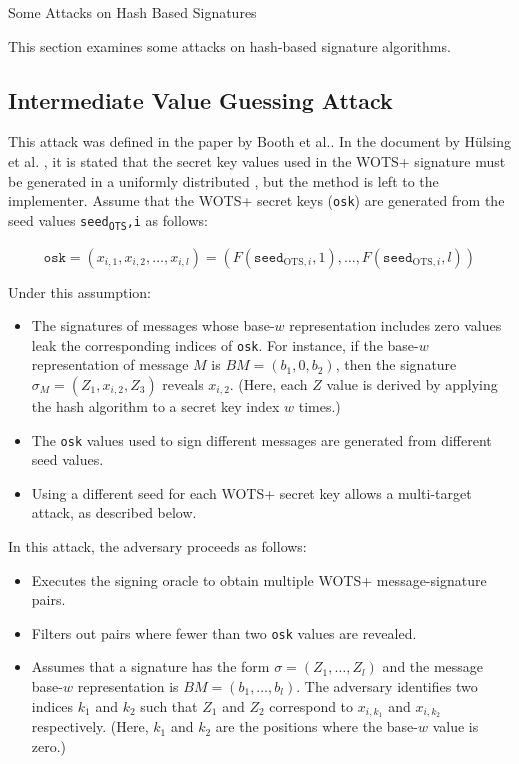 \begin{section}{Some Attacks on Hash Based Signatures}


This section examines some attacks on hash-based signature algorithms.

\subsection{Intermediate Value Guessing Attack}

This attack was defined in the paper by Booth et al.\cite{booth2021intermediate}. In the document by Hülsing et al. \cite{huelsing2018rfc}, it is stated that the secret key values used in the WOTS+ signature must be generated in a uniformly distributed , but the method is left to the implementer. Assume that the WOTS+ secret keys (\texttt{osk}) are generated from the seed values \texttt{seed\textsubscript{OTS},i} as follows:

\[
\texttt{osk} = (x_{i,1}, x_{i,2}, \ldots, x_{i,l}) = (F(\texttt{seed}_{\text{OTS},i},1), \ldots, F(\texttt{seed}_{\text{OTS},i},l))
\]

Under this assumption:

\begin{itemize}
    \item The signatures of messages whose base-$w$ representation includes zero values leak the corresponding indices of \texttt{osk}. For instance, if the base-$w$ representation of message $M$ is $BM = (b_1, 0, b_2)$, then the signature $\sigma_M = (Z_1, x_{i,2}, Z_3)$ reveals $x_{i,2}$. (Here, each $Z$ value is derived by applying the hash algorithm to a secret key index $w$ times.)
    
    \item The \texttt{osk} values used to sign different messages are generated from different seed values.
    
    \item Using a different seed for each WOTS+ secret key allows a multi-target attack, as described below.
\end{itemize}

In this attack, the adversary proceeds as follows:

\begin{itemize}
    \item Executes the signing oracle to obtain multiple WOTS+ message-signature pairs.
    \item Filters out pairs where fewer than two \texttt{osk} values are revealed.
    \item Assumes that a signature has the form $\sigma = (Z_1, \ldots, Z_l)$ and the message base-$w$ representation is $BM = (b_1, \ldots, b_l)$. The adversary identifies two indices $k_1$ and $k_2$ such that $Z_1$ and $Z_2$ correspond to $x_{i,k_1}$ and $x_{i,k_2}$ respectively. (Here, $k_1$ and $k_2$ are the positions where the base-$w$ value is zero.)
    

\end{itemize}
\end{section}
